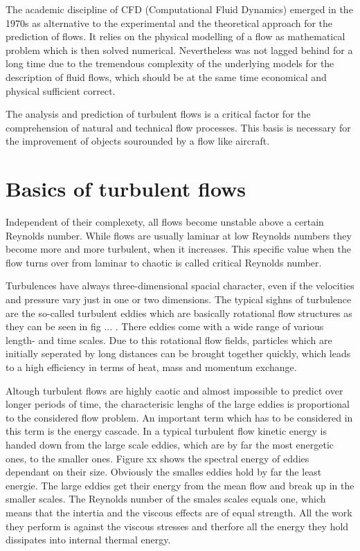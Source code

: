 The academic discipline of CFD (Computational Fluid Dynamics) emerged in the 1970s as alternative to the experimental and the theoretical approach for the prediction of flows. It relies on the physical modelling of a flow as mathematical problem which is then solved numerical. Nevertheless was not lagged behind for a long time due to the tremendous complexity of the underlying models for the description of fluid flows, which should be at the same time economical and physical sufficient correct.

The analysis and prediction of turbulent flows is a critical factor for the comprehension of natural and technical flow processes. This basis is necessary for the improvement of objects sourounded by a flow like aircraft.

\section{Basics of turbulent flows}
Independent of their complexety, all flows become unstable above a certain Reynolds number. While flows are usually laminar at low Reynolds numbers they become more and more turbulent, when it increases. This specific value when the flow turns over from laminar to chaotic is called critical Reynolds number.

Turbulences have always three-dimensional spacial character, even if the velocities and pressure vary just in one or two dimensions. The typical sighns of turbulence are the so-called turbulent eddies which are basically rotational flow structures as they can be seen in fig ... . There eddies come with a wide range of various length- and time scales. Due to this rotational flow fields, particles which are initially seperated by long distances can be brought together quickly, which leads to a high efficiency in terms of heat, mass and momentum exchange.

Altough turbulent flows are highly caotic and almost impossible to predict over longer periods of time, the characterisic lenghs of the large eddies is proportional to the considered flow problem. An important term which has to be considered in this term is the energy cascade. In a typical turbulent flow kinetic energy is handed down from the large scale eddies, which are by far the most energetic ones, to the smaller ones. Figure xx shows the spectral energy of eddies dependant on their size. Obviously the smalles eddies hold by far the least energie. The large eddies get their energy from the mean flow and break up in the smaller scales. The Reynolds number of the smales scales equals one, which means that the intertia and the viscous effects are of equal strength. All the work they perform is against the viscous stresses and therfore all the energy they hold dissipates into internal thermal energy.
